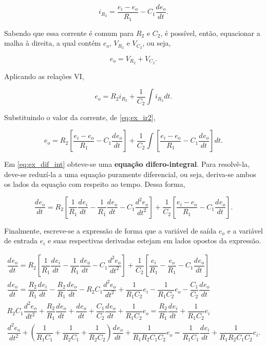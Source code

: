 \documentclass{article}
\numberwithin{equation}{section}
\newcommand{\deo}[1]{\dfrac{d^{#1}e_o}{dt^{#1}}}
\newcommand{\dei}[1]{\dfrac{d^{#1}e_i}{dt^{#1}}}
\let\l\left
\let\r\right
\let\dfr\dfrac
\begin{document}
\begin{equation}
    i_{R_2} = \dfr{e_i-e_o}{R_1} - C_1 \dfr{de_o}{dt}. \label{eq:ex_ir2}
\end{equation}

\noindent Sabendo que essa corrente é comum para $R_2$ e $C_2$, é possível, então, equacionar a malha à direita, a qual contém $e_o$, $V_{R_2}$ e $V_{C_2}$, ou seja,

\begin{equation*}
    e_o = V_{R_2} + V_{C_2}.
\end{equation*}

\noindent Aplicando as relações VI,

\begin{equation*}
    e_o = R_2i_{R_2} + \dfr{1}{C_2}\int i_{R_2}dt.
\end{equation*}

\noindent Substituindo o valor da corrente, de \eqref{eq:ex_ir2},

\begin{equation}
    e_o = R_2\left[\dfr{e_i-e_o}{R_1}-C_1 \deo{}\right] + \dfr{1}{C_2} \int \left[\dfr{e_i-e_o}{R_1} - C_1 \deo{}\right]dt \label{eq:ex_dif_int}.
\end{equation}

\noindent Em \eqref{eq:ex_dif_int} obteve-se uma \textbf{equação difero-integral}. Para resolvê-la, deve-se reduzí-la a uma equação puramente diferencial, ou seja, deriva-se ambos os lados da equação com respeito ao tempo. Dessa forma,

\begin{equation*}
    \deo{} = R_2\l[\dfr{1}{R_1}\dei{}-\dfr{1}{R_1}\deo{}-C_1 \deo{2}\r] + \dfr{1}{C_2}\l[\dfr{e_i-e_o}{R_1} - C_1 \deo{}\r].
\end{equation*}

\noindent Finalmente, escreve-se a expressão de forma que a variável de saída $e_{o}$ e a variável de entrada $e_{i}$ e suas respectivas derivadas estejam em lados opostos da expressão.

\begin{gather}
    \deo{} = R_2 \l[\dfr{1}{R_1} \dei{} - \dfr{1}{R_1}\deo{} - C_1 \deo{2}\r] + \dfr{1}{C_2}\l[\dfr{e_i}{R_1} - \dfr{e_o}{R_1} - C_1 \deo{}\r] \nonumber
    \\
    \deo{} = \dfr{R_2}{R_1}\dei{}-\dfr{R_2}{R_1}\deo{} - R_2C_1 \deo{2} + \dfr{1}{R_1C_2}e_i - \dfr{1}{R_1C_2} e_o - \dfr{C_1}{C_2}\deo{} \nonumber
    \\
    R_2C_1 \deo{2} + \dfr{R_2}{R_1} \deo{} + \deo{} + \dfr{C_1}{C_2} \deo{} + \dfr{1}{R_1C_2}e_o = \dfr{R_2}{R_1} \dei{} + \dfr{1}{R_1C_2}e_i \nonumber
    \\
    \deo{2} + \l(\dfr{1}{R_1C_1} + \dfr{1}{R_2C_1} + \dfr{1}{R_2C_2}\r)\deo{} + \dfr{1}{R_1R_2C_1C_2}e_o = \dfr{1}{R_1C_1}\dei{} + \dfr{1}{R_1R_2C_1C_2}e_i. \label{eq:edol_exemplo}
\end{gather}
\end{document}
